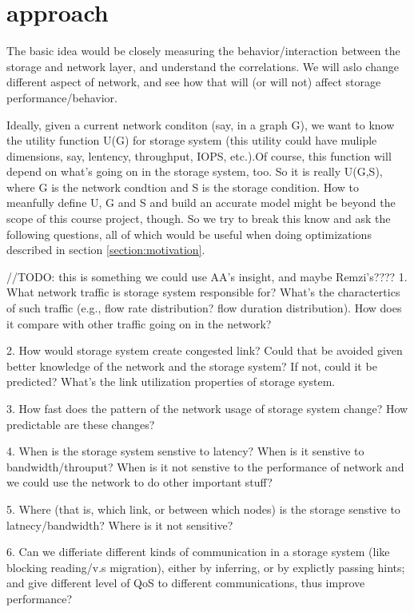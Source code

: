 \section{approach}
\label{sec:approach}
The basic idea would be closely measuring the behavior/interaction between the storage and network layer, and understand the correlations. We will aslo change different aspect of network, and see how that will (or will not) affect storage performance/behavior.

Ideally, given a current network conditon (say, in a graph G), we want to know the utility function U(G) for storage system (this utility could have muliple dimensions, say, lentency, throughput, IOPS, etc.).Of course, this function will depend on what's going on in the storage system, too. So it is really U(G,S), where G is the network condtion and S is the storage  condition. How to meanfully define U, G and S and build an accurate model might be beyond the scope of this course project, though. So we try to break this know and ask the following questions, all of which would be useful when doing optimizations described in section \ref{section:motivation}.

//TODO: this is something we could use AA's insight, and maybe Remzi's????
1. What network traffic is storage system responsible for? What's the charactertics of such traffic (e.g., flow rate distribution? flow duration distribution). How does it compare with other traffic going on in the network?

2. How would storage system create congested link? Could that be avoided given better knowledge of the network and the storage system? If not, could it be predicted? What's the link utilization properties of storage system.

3. How fast does the pattern of the network usage of storage system change? How predictable are these changes?

4. When is the storage system senstive to latency? When is it senstive to bandwidth/throuput? When is it not senstive to the performance of network and we could use the network to do other important stuff? 

5. Where (that is, which link, or between which nodes) is the storage senstive to latnecy/bandwidth? Where is it not sensitive?

6. Can we differiate different kinds of communication in a storage system (like blocking reading/v.s migration), either by inferring, or by explictly passing hints; and give different level of QoS to different communications, thus improve performance?

